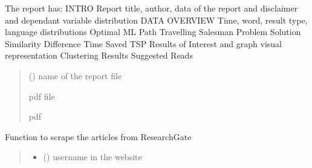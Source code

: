 \documentclass[letterpaper,10pt,english]{sphinxmanual}
\begin{document}
\begin{fulllineitems}
\begin{fulllineitems}
\sphinxAtStartPar
The report has:
INTRO \sphinxhyphen{} Report title, author, data of the report and disclaimer and dependant variable distribution
DATA OVERVIEW \sphinxhyphen{} Time, word, result type, language distributions
Optimal ML Path
\sphinxhyphen{} Travelling Salesman Problem Solution
\sphinxhyphen{} Similarity Difference
\sphinxhyphen{} Time Saved
\sphinxhyphen{} TSP Results of Interest and graph visual representation
\sphinxhyphen{} Clustering Results
Suggested Reads
\begin{quote}\begin{description}
\sphinxAtStartPar
{} () \textendash{} name of the report file

\sphinxAtStartPar
pdf file

\sphinxAtStartPar
pdf

\end{description}\end{quote}

\end{fulllineitems}


\begin{fulllineitems}
\label{\detokenize{BeeLitReview:BeeLitReview.BeeLitReview.researchgate_scraper}}
\pysigstartsignatures
{}
\pysigstopsignatures
\sphinxAtStartPar
Function to scrape the articles from ResearchGate
\begin{quote}\begin{description}
\begin{itemize}
\item {} 
\sphinxAtStartPar
{} () \textendash{} username in the website


\end{itemize}
\end{description}
\end{quote}
\end{fulllineitems}
\end{fulllineitems}
\end{document}
